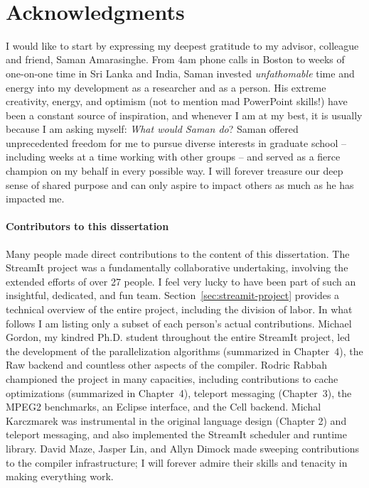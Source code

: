 \newpage
~ \vspace{-3.7\baselineskip}\\
\enlargethispage{0.3\baselineskip}
\section*{Acknowledgments}

I would like to start by expressing my deepest gratitude to my
advisor, colleague and friend, Saman Amarasinghe.
From 4am phone calls in Boston to weeks of one-on-one time in Sri
Lanka and India, Saman invested {\it unfathomable} time and energy
into my development as a researcher and as a person.  His extreme
creativity, energy, and optimism (not to mention mad PowerPoint
skills!) have been a constant source of inspiration, and whenever I am
at my best, it is usually because I am asking myself: {\it What would
Saman do}?  Saman offered unprecedented freedom for me to pursue
diverse interests in graduate school -- including weeks at a time
working with other groups -- and served as a fierce champion on my
behalf in every possible way.  I will forever treasure our deep sense
of shared purpose and can only aspire to impact others as much as he
has impacted me.


\vspace{-8pt}\paragraph*{Contributors to this dissertation} Many
people made direct contributions to the content of this dissertation.
The StreamIt project was a fundamentally collaborative undertaking,
involving the extended efforts of over 27 people.  I feel very lucky
to have been part of such an insightful, dedicated, and fun team.
Section~\ref{sec:streamit-project} provides a technical overview of
the entire project, including the division of labor.  In what follows
I am listing only a subset of each person's actual contributions.
Michael Gordon, my kindred Ph.D. student throughout the entire
StreamIt project, led the development of the parallelization
algorithms (summarized in Chapter~4), the Raw backend and countless
other aspects of the compiler.  Rodric Rabbah championed the project
in many capacities, including contributions to cache optimizations
(summarized in Chapter~4), teleport messaging (Chapter~3), the MPEG2
benchmarks, an Eclipse interface, and the Cell backend.  Michal
Karczmarek was instrumental in the original language design (Chapter
2) and teleport messaging, and also implemented the StreamIt scheduler
and runtime library.  David Maze, Jasper Lin, and Allyn Dimock made
sweeping contributions to the compiler infrastructure; I will forever
admire their skills and tenacity in making everything work.


